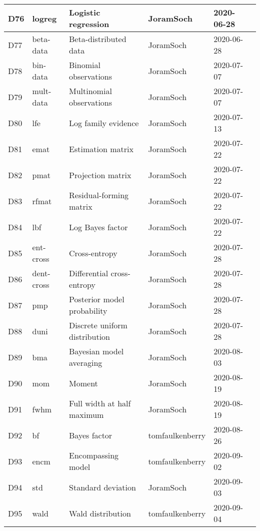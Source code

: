 \documentclass[a4paper,12pt,twoside]{book}
\begin{document}
\begin{longtable}{|p{1cm}|p{2cm}|p{6.5cm}|p{3cm}|p{2cm}|c|}
D76 & logreg & Logistic regression & JoramSoch & 2020-06-28 & \pageref{sec:logreg} \\ \hline
D77 & beta-data & Beta-distributed data & JoramSoch & 2020-06-28 & \pageref{sec:beta-data} \\ \hline
D78 & bin-data & Binomial observations & JoramSoch & 2020-07-07 & \pageref{sec:bin-data} \\ \hline
D79 & mult-data & Multinomial observations & JoramSoch & 2020-07-07 & \pageref{sec:mult-data} \\ \hline
D80 & lfe & Log family evidence & JoramSoch & 2020-07-13 & \pageref{sec:lfe} \\ \hline
D81 & emat & Estimation matrix & JoramSoch & 2020-07-22 & \pageref{sec:emat} \\ \hline
D82 & pmat & Projection matrix & JoramSoch & 2020-07-22 & \pageref{sec:pmat} \\ \hline
D83 & rfmat & Residual-forming matrix & JoramSoch & 2020-07-22 & \pageref{sec:rfmat} \\ \hline
D84 & lbf & Log Bayes factor & JoramSoch & 2020-07-22 & \pageref{sec:lbf} \\ \hline
D85 & ent-cross & Cross-entropy & JoramSoch & 2020-07-28 & \pageref{sec:ent-cross} \\ \hline
D86 & dent-cross & Differential cross-entropy & JoramSoch & 2020-07-28 & \pageref{sec:dent-cross} \\ \hline
D87 & pmp & Posterior model probability & JoramSoch & 2020-07-28 & \pageref{sec:pmp} \\ \hline
D88 & duni & Discrete uniform distribution & JoramSoch & 2020-07-28 & \pageref{sec:duni} \\ \hline
D89 & bma & Bayesian model averaging & JoramSoch & 2020-08-03 & \pageref{sec:bma} \\ \hline
D90 & mom & Moment & JoramSoch & 2020-08-19 & \pageref{sec:mom} \\ \hline
D91 & fwhm & Full width at half maximum & JoramSoch & 2020-08-19 & \pageref{sec:fwhm} \\ \hline
D92 & bf & Bayes factor & tomfaulkenberry & 2020-08-26 & \pageref{sec:bf} \\ \hline
D93 & encm & Encompassing model & tomfaulkenberry & 2020-09-02 & \pageref{sec:encm} \\ \hline
D94 & std & Standard deviation & JoramSoch & 2020-09-03 & \pageref{sec:std} \\ \hline
D95 & wald & Wald distribution & tomfaulkenberry & 2020-09-04 & \pageref{sec:wald} \\ \hline

\end{longtable}
\end{document}
